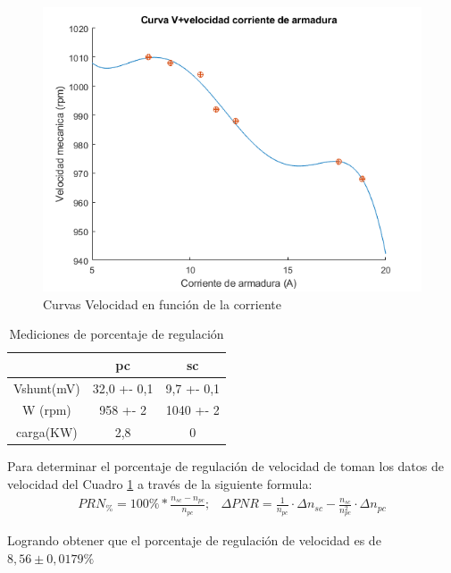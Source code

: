 \documentclass[11pt,letterpaper]{article}     %
\begin{document}
	\begin{figure}[H]
		\centering
		\includegraphics[scale=0.8]{./recursos-Lab6/curvaVelocidadCorriente.png}
		\caption{Curvas Velocidad en función de la corriente}
		\label{fig:CurvaDeVelocidadCorriente}
	\end{figure}

	
	\begin{table}[H]
		\centering
		\caption{Mediciones de porcentaje de regulación}
		\label{Cuadro:Medicion porcentaje de regulacion}
		\begin{tabular}{|c|c|c|}
			\hline
			& pc & sc\\ \hline
			Vshunt(mV)& 32,0 +- 0,1 & 9,7 +- 0,1 \\ \hline
			W (rpm)& 958 +- 2 &1040 +- 2 \\ \hline
			carga(KW)  & 2,8 &0\\ \hline
		\end{tabular}
	\end{table}
 Para determinar el porcentaje de regulación de velocidad de toman los datos de velocidad del Cuadro \ref{Cuadro:Medicion porcentaje de regulacion} a través de la siguiente formula:
 \begin{eqnarray}
  PRN_{\%} =100\%*\frac{n_{sc}-n_{pc}}{n_{pc}}; 
  & \Delta PNR = \frac{1 }{n_{pc}}\cdot \Delta n_{sc}-\frac{n_{sc} }{n_{pc}^2}\cdot \Delta n_{pc}
 \end{eqnarray}
 
Logrando obtener que el porcentaje de regulación de velocidad es de $8,56 \pm 0,0179 \%$
\end{document}
